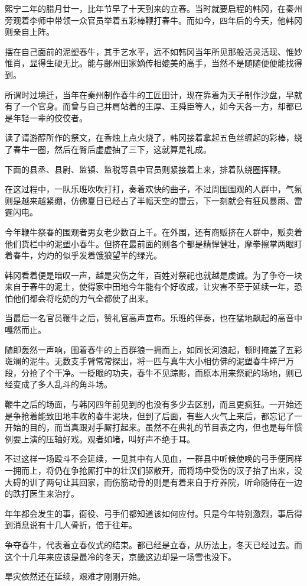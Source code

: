 熙宁二年的腊月廿一，比年节早了十天到来的立春。当时就要启程的韩冈，在秦州旁观着李师中带领一众官员举着五彩棒鞭打春牛。而如今，四年后的今天，他韩冈则亲自上阵。

摆在自己面前的泥塑春牛，其手艺水平，远不如韩冈当年所见那般活灵活现、惟妙惟肖，显得生硬无比。能与鄜州田家嫡传相媲美的高手，当然不是随随便便能找得到。

所谓时过境迁，当年在秦州制作春牛的工匠田计，现在靠着为天子制作沙盘，早就有了一个官身。而曾与自己并肩站着的王厚、王舜臣等人，如今天各一方，却都已是年轻一辈的佼佼者。

读了请游醇所作的祭文，在香烛上点火烧了，韩冈接着拿起五色丝缠起的彩棒，绕了春牛一圈，然后在臀后虚虚抽了三下，这就算是礼成。

下面的县丞、县尉、监镇、监税等县中官员则紧接着上来，排着队绕圈挥鞭。

在这过程中，一队乐班吹吹打打，奏着欢快的曲子，不过周围围观的人群中，气氛则是越来越紧绷，仿佛夏日已经占了半幅天空的雷云，下一刻就会有狂风暴雨、雷霆闪电。

今年鞭牛祭春的围观者男女老少数百上千。在外围，还有商贩挤在人群中，贩卖着他们货栏中的泥塑小春牛。但挤在最前面的则各个都是精悍健壮，摩拳擦掌两眼盯着春牛，灼灼的似乎发着饿狼望羊的绿光。

韩冈看着便是暗叹一声，越是灾伤之年，百姓对祭祀也就越是虔诚。为了争夺一块来自于春牛的泥土，使得家中田地今年能有个好收成，让灾害不至于延续一年，恐怕他们都会将吃奶的力气全都使了出来。

当最后一名官员鞭牛之后，赞礼官高声宣布。乐班的伴奏，也在猛地飙起的高音中嘎然而止。

随即轰然一声响，围着春牛的上百群狼一拥而上，如同长河浪起，顿时掩盖了五彩斑斓的泥牛。无数支手臂常常探出，将一匹与真牛大小相仿佛的泥塑春牛碎尸万段，分抢了个干净。一眨眼的功夫，春牛不见踪影，而原本用来祭祀的场地，则已经变成了多人乱斗的角斗场。

鞭牛之后的场面，与韩冈四年前见到的也没有多少去区别，而且更疯狂。一开始还是争抢着能致田地丰收的春牛泥块，但到了后面，有些人火气上来后，都忘记了一开始的目的，而当真跟对手厮打起来。虽然不在典礼的节目表之内，但也是每年惯例要上演的压轴好戏。观者如堵，叫好声不绝于耳。

不过这样一场殴斗不会延续，一见其中有人见血，一群县中听候使唤的弓手便同样一拥而上，将仍在争抢厮打中的壮汉们驱散开，而将场中受伤的汉子抬了出来，没大碍的训了两句让其回家，而伤筋动骨的则是有着来自于疗养院，听命随侍在一边的跌打医生来治疗。

年年都会发生的事，衙役、弓手们都知道该如何应付。只是今年特别激烈，事后得到消息说有十几人骨折，倍于往年。

争夺春牛，代表着立春仪式的结束。都已经是立春，从历法上，冬天已经过去。而这个十几年来应该是最冷的冬天，京畿这边却是一场雪也没下。

旱灾依然还在延续，艰难才刚刚开始。

